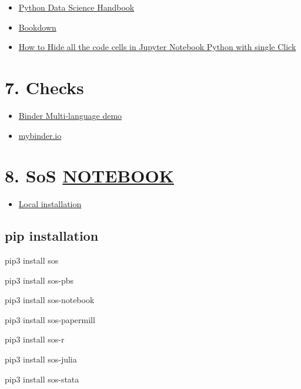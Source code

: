 \documentclass[
  12pt,
]{article}
\providecommand{\tightlist}{%
  \setlength{\itemsep}{0pt}\setlength{\parskip}{0pt}}
\begin{document}
\begin{itemize}
\item
  \href{https://jakevdp.github.io/PythonDataScienceHandbook/}{Python
  Data Science Handbook}
\item
  \href{https://bookdown.org/}{Bookdown}
\item
  \href{https://www.youtube.com/watch?v=rJsWJMBksK0}{How to Hide all the
  code cells in Jupyter Notebook Python with single Click}
\end{itemize}

\hypertarget{checks}{%
\section{7. Checks}\label{checks}}

\begin{itemize}
\item
  \href{https://github.com/binder-examples/multi-language-demo}{Binder
  Multi-language demo}
\item
  \href{https://mybinder.readthedocs.io/en/latest/index.html}{mybinder.io}
\end{itemize}

\hypertarget{sos-notebook}{%
\section{\texorpdfstring{8. SoS
\href{https://vatlab.github.io/sos-docs/}{NOTEBOOK}}{8. SoS NOTEBOOK}}\label{sos-notebook}}

\begin{itemize}
\tightlist
\item
  \href{https://vatlab.github.io/sos-docs/running.html\#Local-installation}{Local
  installation}
\end{itemize}

\hypertarget{pip-installation}{%
\subsection{pip installation}\label{pip-installation}}

pip3 install sos

pip3 install sos-pbs

pip3 install sos-notebook

pip3 install sos-papermill

pip3 install sos-r

pip3 install sos-julia

pip3 install sos-stata
\end{document}
